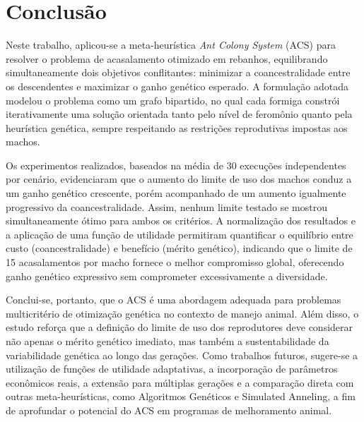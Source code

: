 \section{Conclusão}
\label{sec-conclusao}

Neste trabalho, aplicou-se a meta-heurística \textit{Ant Colony System} (ACS) para resolver o problema de acasalamento otimizado em rebanhos, equilibrando simultaneamente dois objetivos conflitantes: minimizar a coancestralidade entre os descendentes e maximizar o ganho genético esperado. A formulação adotada modelou o problema como um grafo bipartido, no qual cada formiga constrói iterativamente uma solução orientada tanto pelo nível de feromônio quanto pela heurística genética, sempre respeitando as restrições reprodutivas impostas aos machos. 

Os experimentos realizados, baseados na média de 30 execuções independentes por cenário, evidenciaram que o aumento do limite de uso dos machos conduz a um ganho genético crescente, porém acompanhado de um aumento igualmente progressivo da coancestralidade. Assim, nenhum limite testado se mostrou simultaneamente ótimo para ambos os critérios. A normalização dos resultados e a aplicação de uma função de utilidade permitiram quantificar o equilíbrio entre custo (coancestralidade) e benefício (mérito genético), indicando que o limite de 15 acasalamentos por macho fornece o melhor compromisso global, oferecendo ganho genético expressivo sem comprometer excessivamente a diversidade.

Conclui-se, portanto, que o ACS é uma abordagem adequada para problemas multicritério de otimização genética no contexto de manejo animal. Além disso, o estudo reforça que a definição do limite de uso dos reprodutores deve considerar não apenas o mérito genético imediato, mas também a sustentabilidade da variabilidade genética ao longo das gerações. Como trabalhos futuros, sugere-se a utilização de funções de utilidade adaptativas, a incorporação de parâmetros econômicos reais, a extensão para múltiplas gerações e a comparação direta com outras meta-heurísticas, como Algoritmos Genéticos e Simulated Anneling, a fim de aprofundar o potencial do ACS em programas de melhoramento animal.
